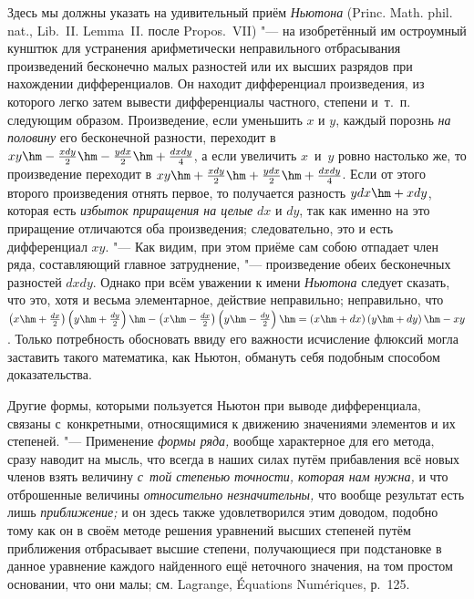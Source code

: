 Здесь мы должны указать на удивительный приём {\em Ньютона} (Princ. Math.
phil. nat., Lib.~II. Lemma~II. после Propos.~VII) "--- на изобретённый им
остроумный кунштюк для устранения арифметически неправильного отбрасывания
произведений бесконечно малых разностей или их высших разрядов при
нахождении дифференциалов. Он находит дифференциал произведения, из
которого легко затем вывести дифференциалы частного, степени и~т.~п.
следующим образом. Произведение, если уменьшить $x$ и $y$, каждый порознь
{\em на половину} его бесконечной разности, переходит в
$xy\hm-\frac{xdy}2\hm-\frac{ydx}2\hm+\frac{dxdy}4$, а если увеличить
$x$~и~$y$ ровно настолько же, то произведение переходит в
$xy\hm+\frac{xdy}2\hm+\frac{ydx}2\hm+\frac{dxdy}4$. Если от этого второго
произведения отнять первое, то получается разность $ydx\hm+xdy$, которая есть
{\em избыток приращения на целые} $dx$ и $dy$, так как именно на это приращение
отличаются оба произведения; следовательно, это и есть дифференциал $xy$. "---
Как видим, при этом приёме сам собою отпадает член ряда, составляющий главное
затруднение, "--- произведение обеих бесконечных разностей $dxdy$. Однако при
всём уважении к имени {\em Ньютона} следует сказать, что это, хотя и весьма элементарное,
действие неправильно; неправильно, что
$\left(x\hm+\frac{dx}2\right)\left(y\hm+\frac{dy}2\right)\hm-
\left(x\hm-\frac{dx}2\right)\left(y\hm-\frac{dy}2\right)\hm=
\left(x\hm+dx\right)\left(y\hm+dy\right)\hm-xy$. Только потребность обосновать
ввиду его важности исчисление флюксий могла заставить такого математика, как
Ньютон, обмануть себя подобным способом доказательства.

Другие формы, которыми пользуется Ньютон при выводе дифференциала, связаны
с~конкретными, относящимися к движению значениями элементов и их степеней. "---
Применение {\em формы ряда,} вообще характерное для его метода,
сразу наводит на мысль, что всегда в наших силах путём
прибавления всё новых членов взять величину
{\em с~той степенью точности, которая нам нужна,} и что отброшенные
величины {\em относительно незначительны,} что вообще результат
есть лишь {\em приближение;} и он здесь
также удовлетворился этим доводом, подобно тому как он в своём методе
решения уравнений высших степеней путём приближения отбрасывает высшие
степени, получающиеся при подстановке в данное уравнение каждого найденного
ещё неточного значения, на том простом основании, что они малы;
см. Lagrange, Équa\-ti\-ons Nu\-mé\-ri\-ques, р.~125.

